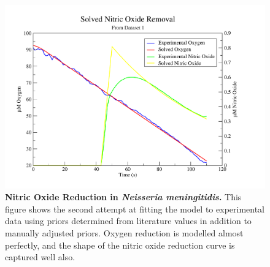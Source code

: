 \begin{figure}[tbp]
 \centering
 \includegraphics[width=15cm, trim=1cm 1cm 3cm 1cm, clip=true]{./06-noreduction/data/aer-no-sim1-2.pdf}
 \caption[{Nitric Oxide Reduction in \textit{Neisseria meningitidis}.}]{{\bf Nitric Oxide Reduction in \textit{Neisseria meningitidis}.} This figure shows the second attempt at fitting the model to experimental data using priors determined from literature values in addition to manually adjusted priors. Oxygen reduction is modelled almost perfectly, and the shape of the nitric oxide reduction curve is captured well also.}
 \label{fig:nosim1.2}
\end{figure}

